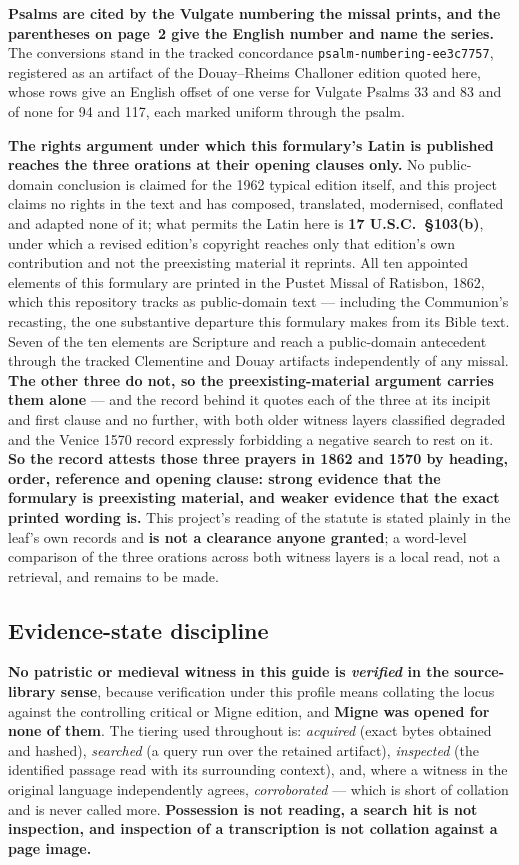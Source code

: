 \textbf{Psalms are cited by the Vulgate numbering the missal prints, and the
parentheses on page~2 give the English number and name the series.} The
conversions stand in the tracked concordance
\texttt{psalm-numbering-ee3c7757}, registered as an artifact of the
Douay--Rheims Challoner edition quoted here, whose rows give an English offset
of one verse for Vulgate Psalms 33 and 83 and of none for 94 and 117, each
marked uniform through the psalm.

\textbf{The rights argument under which this formulary's Latin is published
reaches the three orations at their opening clauses only.} No public-domain
conclusion is claimed for the 1962 typical edition itself, and this project
claims no rights in the text and has composed, translated, modernised,
conflated and adapted none of it; what permits the Latin here is
\textbf{17 U.S.C.\ \S103(b)}, under which a revised edition's copyright reaches
only that edition's own contribution and not the preexisting material it
reprints. All ten appointed elements of this formulary are printed in the Pustet
Missal of Ratisbon, 1862, which this repository tracks as public-domain text ---
including the Communion's recasting, the one substantive departure this
formulary makes from its Bible text. Seven of the ten
elements are Scripture and reach a public-domain antecedent through the tracked
Clementine and Douay artifacts independently of any missal. \textbf{The other
three do not, so the preexisting-material argument carries them alone} --- and
the record behind it quotes each of the three at its incipit and first clause
and no further, with both older witness layers classified degraded and the
Venice 1570 record expressly forbidding a negative search to rest on it.
\textbf{So the record attests those three prayers in 1862 and 1570 by heading,
order, reference and opening clause: strong evidence that the formulary is
preexisting material, and weaker evidence that the exact printed wording is.}
This project's reading of the statute is stated plainly in the leaf's own
records and \textbf{is not a clearance anyone granted}; a word-level comparison
of the three orations across both witness layers is a local read, not a
retrieval, and remains to be made.

\subsection*{Evidence-state discipline}

\textbf{No patristic or medieval witness in this guide is \emph{verified} in the
source-library sense}, because verification under this profile means collating
the locus against the controlling critical or Migne edition, and \textbf{Migne
was opened for none of them}. The tiering used throughout is: \emph{acquired}
(exact bytes obtained and hashed), \emph{searched} (a query run over the
retained artifact), \emph{inspected} (the identified passage read with its
surrounding context), and, where a witness in the original language
independently agrees, \emph{corroborated} --- which is short of collation and is
never called more. \textbf{Possession is not reading, a search hit is not
inspection, and inspection of a transcription is not collation against a page
image.}

